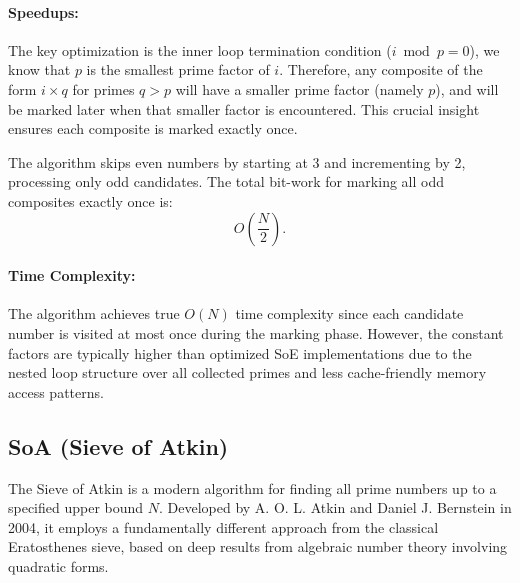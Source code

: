 \documentclass{article}
\begin{document}
\paragraph{Speedups:}
The key optimization is the inner loop termination condition ($i \bmod p = 0$), we know that $p$ is the smallest prime factor of $i$. Therefore, any composite of the form $i \times q$ for primes $q > p$ will have a smaller prime factor (namely $p$), and will be marked later when that smaller factor is encountered. This crucial insight ensures each composite is marked exactly once.

The algorithm skips even numbers by starting at 3 and incrementing by 2, processing only odd candidates. The total bit-work for marking all odd composites exactly once is:
\[
O\left(\frac{N}{2}\right).
\]

\paragraph{Time Complexity:} The algorithm achieves true $O(N)$ time complexity since each candidate number is visited at most once during the marking phase. However, the constant factors are typically higher than optimized SoE implementations due to the nested loop structure over all collected primes and less cache-friendly memory access patterns.

\subsection{SoA (Sieve of Atkin)} \label{alg:soa}
The Sieve of Atkin is a modern algorithm for finding all prime numbers up to a specified upper bound $N$. Developed by A. O. L. Atkin and Daniel J. Bernstein in 2004, it employs a fundamentally different approach from the classical Eratosthenes sieve, based on deep results from algebraic number theory involving quadratic forms.
\end{document}
